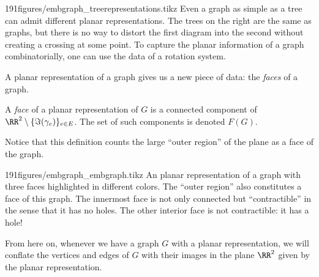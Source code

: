 \begin{examplefigureenv}{191figures/embgraph_treerepresentations.tikz}	Even a graph as simple as a tree can admit different planar representations. The trees on the right are the same as graphs, but there is no way to distort the first diagram into the second without creating a crossing at some point. To capture the planar information of a graph combinatorially, one can use the data of a rotation system.
\end{examplefigureenv}
A planar representation of a graph gives us a new piece of data: the \emph{faces} of a graph. 
\begin{definition} A \emph{face} of a planar representation of $G$ is a connected component of $\RR^2\setminus \{\Im(\gamma_e)\}_{e\in E}$.  The set of such components is denoted $F(G)$. 
\end{definition}
 Notice that this definition counts the large ``outer region'' of the plane as a face of the graph. 
 \begin{examplefigureenv}{191figures/embgraph_embgraph.tikz}
  An planar representation of a graph with three faces highlighted in different colors. The ``outer region'' also constitutes a face of this graph. The innermost face is not only connected but ``contractible'' in the sense that it has no holes. The other interior face is not contractible: it has a hole! 
 \end{examplefigureenv}
  From here on, whenever we have a graph $G$ with a planar representation, we will conflate the vertices and edges of $G$ with their images in the plane $\RR^2$ given by the planar representation.
